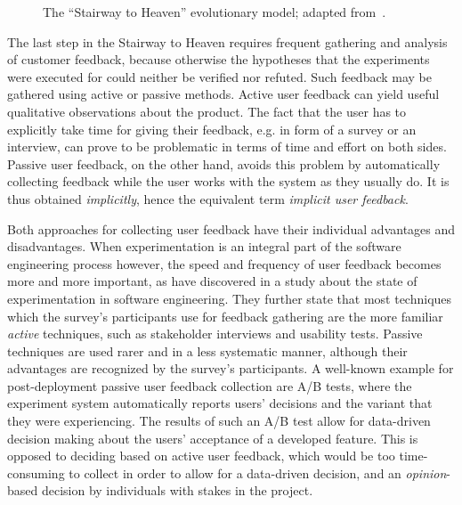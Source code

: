 \begin{figure}[ht]
        \caption{The ``Stairway to Heaven'' evolutionary model; adapted from~\cite{Olsson2012}.}
        \label{fig:stairway}
\end{figure}

The last step in the Stairway to Heaven requires frequent gathering and analysis of customer feedback, because otherwise the hypotheses that the experiments were executed for could neither be verified nor refuted.
Such feedback may be gathered using active or passive methods.
Active user feedback can yield useful qualitative observations about the product.
The fact that the user has to explicitly take time for giving their feedback, e.g. in form of a survey or an interview, can prove to be problematic in terms of time and effort on both sides.
Passive user feedback, on the other hand, avoids this problem by automatically collecting feedback while the user works with the system as they usually do.
It is thus obtained \emph{implicitly}, hence the equivalent term \emph{implicit user feedback}.

Both approaches for collecting user feedback have their individual advantages and disadvantages.
When experimentation is an integral part of the software engineering process however, the speed and frequency of user feedback becomes more and more important, as \citet{lindgren2015software} have discovered in a study about the state of experimentation in software engineering.
They further state that most techniques which the survey's participants use for feedback gathering are the more familiar \emph{active} techniques, such as stakeholder interviews and usability tests.
Passive techniques are used rarer and in a less systematic manner, although their advantages are recognized by the survey's participants.
A well-known example for post-deployment passive user feedback collection are A/B tests, where the experiment system automatically reports users' decisions and the variant that they were experiencing.
The results of such an A/B test allow for data-driven decision making about the users' acceptance of a developed feature.
This is opposed to deciding based on active user feedback, which would be too time-consuming to collect in order to allow for a data-driven decision, and an \emph{opinion}-based decision by individuals with stakes in the project.

